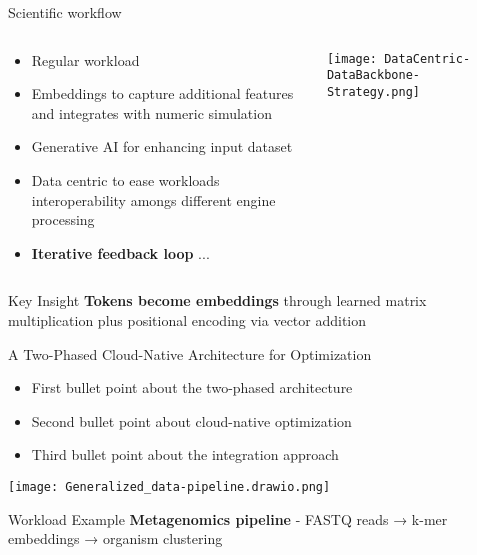 \documentclass[aspectratio=169]{beamer}
\begin{document}
\begin{frame}{Scientific workflow}
    \begin{columns}
        \begin{column}{0.5\textwidth}
            \begin{itemize}
                \item Regular workload
                \item Embeddings to capture additional features and integrates with numeric simulation
                \item Generative AI for enhancing input dataset
                \item Data centric to ease workloads interoperability amongs different engine processing
                \item \textbf {Iterative feedback loop} ...
            \end{itemize}
        \end{column}
        \begin{column}{0.5\textwidth}
            \texttt{[image: DataCentric-DataBackbone-Strategy.png]}
        \end{column}
    \end{columns}
    
    \vspace{0.3cm}
    \begin{block}{Key Insight}
        \textbf {Tokens become embeddings} through learned matrix multiplication plus positional encoding via vector addition
    \end{block}
\end{frame}

\begin{frame}{A Two-Phased Cloud-Native Architecture for Optimization}
    \begin{itemize}
        \item First bullet point about the two-phased architecture
        \item Second bullet point about cloud-native optimization
        \item Third bullet point about the integration approach
    \end{itemize}
    
    \vspace{0.4cm}
    
    \begin{center}
        \texttt{[image: Generalized\_data-pipeline.drawio.png]}
    \end{center}
    
    \vspace{0.3cm}
    \begin{block}{Workload Example}
        \textbf{Metagenomics pipeline}  - FASTQ reads → k-mer embeddings → organism clustering
    \end{block}
\end{frame}
\end{document}
